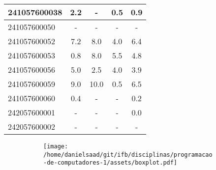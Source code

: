 \documentclass{article}
\begin{document}
\begin{longtable}{|l|c|c|c|c|}
241057600038 & 2.2 & - & 0.5 & 0.9\\\hline
241057600050 & - & - & - & -\\\hline
241057600052 & 7.2 & 8.0 & 4.0 & 6.4\\\hline
241057600053 & 0.8 & 8.0 & 5.5 & 4.8\\\hline
241057600056 & 5.0 & 2.5 & 4.0 & 3.9\\\hline
241057600059 & 9.0 & 10.0 & 0.5 & 6.5\\\hline
241057600060 & 0.4 & - & - & 0.2\\\hline
242057600001 & - & - & - & 0.0\\\hline
242057600002 & - & - & - & -\\\hline
\end{longtable}
\begin{figure}[h!]
\centering\begin{subfigure}
        \centering
        \texttt{[image: /home/danielsaad/git/ifb/disciplinas/programacao-de-computadores-1/assets/boxplot.pdf]}
    \end{subfigure}\end{figure}
\end{document}

